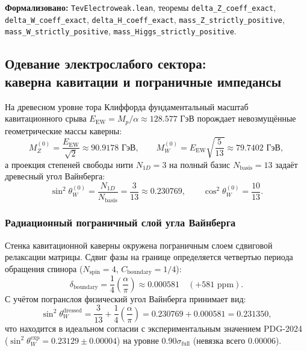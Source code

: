 \documentclass[11pt,a4paper]{article}
\theoremstyle{definition}
\theoremstyle{remark}
\begin{document}
\noindent\small\textbf{Формализовано:} \texttt{TevElectroweak.lean}, теоремы \texttt{delta_Z_coeff_exact}, \texttt{delta_W_coeff_exact}, \texttt{delta_H_coeff_exact}, \texttt{mass_Z_strictly_positive}, \texttt{mass_W_strictly_positive}, \texttt{mass_Higgs_strictly_positive}.

\subsection{Одевание электрослабого сектора:\\ каверна кавитации и пограничные импедансы}
\label{subsec:electroweak_dressed_canonical}

На древесном уровне тора Клиффорда фундаментальный масштаб кавитационного срыва $E_{\mathrm{EW}} = M_p / \alpha \approx 128.577\text{ ГэВ}$ порождает невозмущённые геометрические массы каверны:
\begin{equation}
M_Z^{(0)} = \frac{E_{\mathrm{EW}}}{\sqrt{2}} \approx 90.9178\text{ ГэВ}, \qquad
M_W^{(0)} = E_{\mathrm{EW}}\sqrt{\frac{5}{13}} \approx 79.7402\text{ ГэВ},
\end{equation}
а проекция степеней свободы нити $N_{1D} = 3$ на полный базис $N_{\mathrm{basis}} = 13$ задаёт древесный угол Вайнберга:
\begin{equation}
\sin^2\theta_W^{(0)} = \frac{N_{1D}}{N_{\mathrm{basis}}} = \frac{3}{13} \approx 0.230769, \qquad
\cos^2\theta_W^{(0)} = \frac{10}{13}.
\end{equation}

\subsubsection{Радиационный пограничный слой угла Вайнберга}

Стенка кавитационной каверны окружена пограничным слоем сдвиговой релаксации матрицы. Сдвиг фазы на границе определяется четвертью периода обращения спинора ($N_{\mathrm{spin}} = 4$, $C_{\mathrm{boundary}} = 1/4$):
\begin{equation}
\delta_{\mathrm{boundary}} = \frac{1}{4} \left(\frac{\alpha}{\pi}\right) \approx 0.000581 \quad (+581\text{ ppm}).
\end{equation}
С учётом погранслоя физический угол Вайнберга принимает вид:
\begin{equation}
\sin^2\theta_W^{\mathrm{dressed}} = \frac{3}{13} + \frac{1}{4}\left(\frac{\alpha}{\pi}\right) = 0.230769 + 0.000581 = \mathbf{0.231350},
\end{equation}
что находится в идеальном согласии с экспериментальным значением PDG-2024 ($\sin^2\theta_W^{\mathrm{exp}} = 0.23129 \pm 0.00004$) на уровне $0.90\sigma_{\mathrm{full}}$ (невязка всего $0.00006$).
\end{document}
